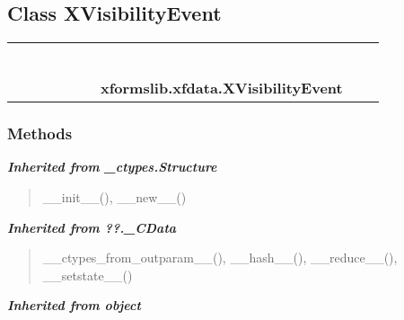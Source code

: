 \subsection{Class XVisibilityEvent}

    \label{xformslib:xfdata:XVisibilityEvent}
\begin{tabular}{cccccccccc}
\multicolumn{2}{r}{\settowidth{\BCL}{object}\multirow{2}{\BCL}{object}}
&&
&&
&&
  \\\cline{3-3}
  &&\multicolumn{1}{c|}{}
&&
&&
&&
  \\
\multicolumn{4}{r}{\settowidth{\BCL}{??.\_CData}\multirow{2}{\BCL}{??.\_CData}}
&&
&&
  \\\cline{5-5}
  &&&&\multicolumn{1}{c|}{}
&&
&&
  \\
\multicolumn{6}{r}{\settowidth{\BCL}{\_ctypes.Structure}\multirow{2}{\BCL}{\_ctypes.Structure}}
&&
  \\\cline{7-7}
  &&&&&&\multicolumn{1}{c|}{}
&&
  \\
&&&&&&\multicolumn{2}{l}{\textbf{xformslib.xfdata.XVisibilityEvent}}
\end{tabular}



  \subsubsection{Methods}


\large{\textbf{\textit{Inherited from \_ctypes.Structure}}}

\begin{quote}
\_\_init\_\_(), \_\_new\_\_()
\end{quote}

\large{\textbf{\textit{Inherited from ??.\_CData}}}

\begin{quote}
\_\_ctypes\_from\_outparam\_\_(), \_\_hash\_\_(), \_\_reduce\_\_(), \_\_setstate\_\_()
\end{quote}

\large{\textbf{\textit{Inherited from object}}}


